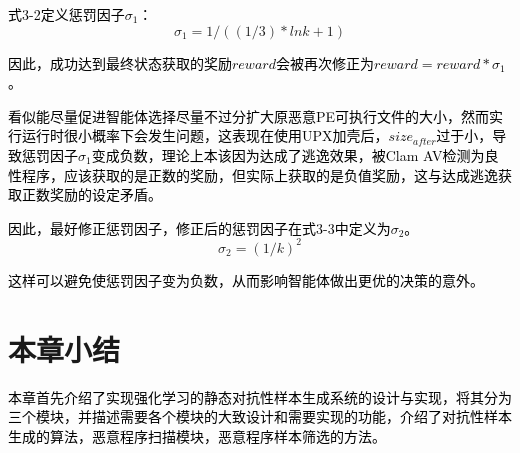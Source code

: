 \textcolor{black}{式3-2定义惩罚因子$\sigma_{1}$：}
\begin{equation}
    \sigma_{1}=1/((1/3)*lnk+1)
\end{equation}

\textcolor{black}{因此，成功达到最终状态获取的奖励$reward$会被再次修正为$reward=reward*\sigma_{1}$。}

\textcolor{black}{看似能尽量促进智能体选择尽量不过分扩大原恶意PE可执行文件的大小，然而实行运行时很小概率下会发生问题，这表现在使用UPX加壳后，$size_{after}$过于小，导致惩罚因子$\sigma_{1}$变成负数，理论上本该因为达成了逃逸效果，被Clam AV检测为良性程序，应该获取的是正数的奖励，但实际上获取的是负值奖励，这与达成逃逸获取正数奖励的设定矛盾。}

\textcolor{black}{因此，最好修正惩罚因子，修正后的惩罚因子在式3-3中定义为$\sigma_{2}$。}
\begin{equation}
    \sigma_2=(1/k)^2
\end{equation}

\textcolor{black}{这样可以避免使惩罚因子变为负数，从而影响智能体做出更优的决策的意外。}

\section{本章小结}

\textcolor{black}{本章首先介绍了实现强化学习的静态对抗性样本生成系统的设计与实现，将其分为三个模块，并描述需要各个模块的大致设计和需要实现的功能，介绍了对抗性样本生成的算法，恶意程序扫描模块，恶意程序样本筛选的方法。}